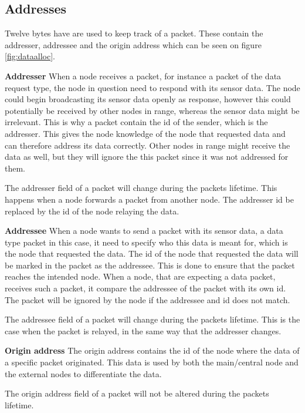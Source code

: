 \subsection{Addresses}
Twelve bytes have are used to keep track of a packet. These contain the addresser, addressee and the origin address which can be seen on figure \ref{fig:dataalloc}. 

\textbf{Addresser}\newline
When a node receives a packet, for instance a packet of the data request type, the node in question need to respond with its sensor data. The node could begin broadcasting its sensor data openly as response, however this could potentially be received by other nodes in range, whereas the sensor data might be irrelevant. This is why a packet contain the id of the sender, which is the addresser. This gives the node knowledge of the node that requested data and can therefore address its data correctly. Other nodes in range might receive the data as well, but they will ignore the this packet since it was not addressed for them.

The addresser field of a packet will change during the packets lifetime. This happens when a node forwards a packet from another node. The addresser id be replaced by the id of the node relaying the data.

\textbf{Addressee}\newline
When a node wants to send a packet with its sensor data, a data type packet in this case, it need to specify who this data is meant for, which is the node that requested the data. The id of the node that requested the data will be marked in the packet as the addressee. This is done to ensure that the packet reaches the intended node. When a node, that are expecting a data packet, receives such a packet, it compare the addressee of the packet with its own id. The packet will be ignored by the node if the addressee and id does not match.

The addressee field of a packet will change during the packets lifetime. This is the case when the packet is relayed, in the same way that the addresser changes.

\textbf{Origin address}\newline
The origin address contains the id of the node where the data of a specific packet originated. This data is used by both the main/central node and the external nodes to differentiate the data.

The origin address field of a packet will not be altered during the packets lifetime.


